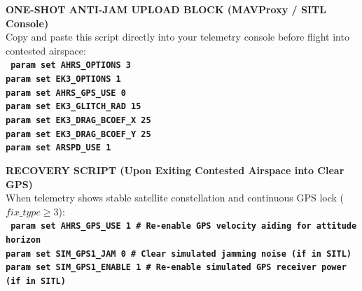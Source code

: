 \documentclass[10pt,letterpaper]{article}
\begin{document}
\vspace{3mm}
\begin{tcolorbox}[colback=aerocallout,colframe=aerocalloutborder,arc=1.5mm,boxrule=0.7pt,top=2.2mm,bottom=2.2mm,left=4mm,right=4mm]
\textbf{\normalsize\color{aeroblue}ONE-SHOT ANTI-JAM UPLOAD BLOCK (MAVProxy / SITL Console)} \\[0.8mm]
{\footnotesize Copy and paste this script directly into your telemetry console before flight into contested airspace:} \\[1.2mm]
\texttt{\small\bfseries\color{aeroblue}
param set AHRS\_OPTIONS 3 \\
param set EK3\_OPTIONS 1 \\
param set AHRS\_GPS\_USE 0 \\
param set EK3\_GLITCH\_RAD 15 \\
param set EK3\_DRAG\_BCOEF\_X 25 \\
param set EK3\_DRAG\_BCOEF\_Y 25 \\
param set ARSPD\_USE 1
}
\end{tcolorbox}

\vspace{2mm}
\begin{tcolorbox}[colback=aerolight,colframe=aeroborder,arc=1.5mm,boxrule=0.6pt,top=2.2mm,bottom=2.2mm,left=4mm,right=4mm]
\textbf{\small\color{aeroblue}RECOVERY SCRIPT (Upon Exiting Contested Airspace into Clear GPS)} \\[0.8mm]
{\footnotesize When telemetry shows stable satellite constellation and continuous GPS lock ($fix\_type \ge 3$):} \\[1.2mm]
\texttt{\footnotesize\bfseries\color{aeroblue}
param set AHRS\_GPS\_USE 1 \hfill \color{gray}\# Re-enable GPS velocity aiding for attitude horizon \\
param set SIM\_GPS1\_JAM 0 \hfill \color{gray}\# Clear simulated jamming noise (if in SITL) \\
param set SIM\_GPS1\_ENABLE 1 \hfill \color{gray}\# Re-enable simulated GPS receiver power (if in SITL)
}
\end{tcolorbox}

\clearpage

\end{document}
